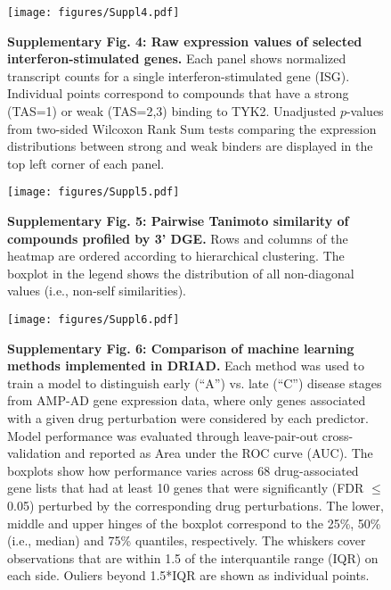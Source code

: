 \documentclass{article}
\begin{document}

\begin{figure}
  \begin{center}
    \texttt{[image: figures/Suppl4.pdf]}
  \end{center}
  \caption*{\textbf{Supplementary Fig. 4: Raw expression values of selected interferon-stimulated genes.} Each panel shows normalized transcript counts for a single interferon-stimulated gene (ISG). Individual points correspond to compounds that have a strong (TAS=1) or weak (TAS=2,3) binding to TYK2. Unadjusted $p$-values from two-sided Wilcoxon Rank Sum tests comparing the expression distributions between strong and weak binders are displayed in the top left corner of each panel.}
\end{figure}


\begin{figure}
  \begin{center}
    \texttt{[image: figures/Suppl5.pdf]}
  \end{center}
  \caption*{\textbf{Supplementary Fig. 5: Pairwise Tanimoto similarity of compounds profiled by 3’ DGE.} Rows and columns of the heatmap are ordered according to hierarchical clustering. The boxplot in the legend shows the distribution of all non-diagonal values (i.e., non-self similarities).}
\end{figure}

\begin{figure}
  \begin{center}
    \texttt{[image: figures/Suppl6.pdf]}
  \end{center}
  \caption*{\textbf{Supplementary Fig. 6: Comparison of machine learning methods implemented in DRIAD.} Each method was used to train a model to distinguish early (“A”) vs. late (“C”) disease stages from AMP-AD gene expression data, where only genes associated with a given drug perturbation were considered by each predictor. Model performance was evaluated through leave-pair-out cross-validation and reported as Area under the ROC curve (AUC). The boxplots show how performance varies across 68 drug-associated gene lists that had at least 10 genes that were significantly (FDR $\leq$ 0.05) perturbed by the corresponding drug perturbations. The lower, middle and upper hinges of the boxplot correspond to the 25\%, 50\% (i.e., median) and 75\% quantiles, respectively. The whiskers cover observations that are within 1.5 of the interquantile range (IQR) on each side. Ouliers beyond 1.5*IQR are shown as individual points.}
\end{figure}
\end{document}
